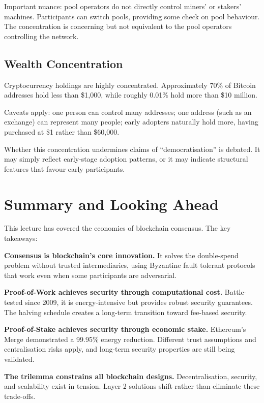 \documentclass[11pt,a4paper]{article}
\begin{document}
Important nuance: pool operators do not directly control miners' or stakers' machines. Participants can switch pools, providing some check on pool behaviour. The concentration is concerning but not equivalent to the pool operators controlling the network.

\subsection{Wealth Concentration}

Cryptocurrency holdings are highly concentrated. Approximately 70\% of Bitcoin addresses hold less than \$1,000, while roughly 0.01\% hold more than \$10 million.

Caveats apply: one person can control many addresses; one address (such as an exchange) can represent many people; early adopters naturally hold more, having purchased at \$1 rather than \$60,000.

Whether this concentration undermines claims of ``democratisation'' is debated. It may simply reflect early-stage adoption patterns, or it may indicate structural features that favour early participants.

\section{Summary and Looking Ahead}

This lecture has covered the economics of blockchain consensus. The key takeaways:

\textbf{Consensus is blockchain's core innovation.} It solves the double-spend problem without trusted intermediaries, using Byzantine fault tolerant protocols that work even when some participants are adversarial.

\textbf{Proof-of-Work achieves security through computational cost.} Battle-tested since 2009, it is energy-intensive but provides robust security guarantees. The halving schedule creates a long-term transition toward fee-based security.

\textbf{Proof-of-Stake achieves security through economic stake.} Ethereum's Merge demonstrated a 99.95\% energy reduction. Different trust assumptions and centralisation risks apply, and long-term security properties are still being validated.

\textbf{The trilemma constrains all blockchain designs.} Decentralisation, security, and scalability exist in tension. Layer 2 solutions shift rather than eliminate these trade-offs.
\end{document}
